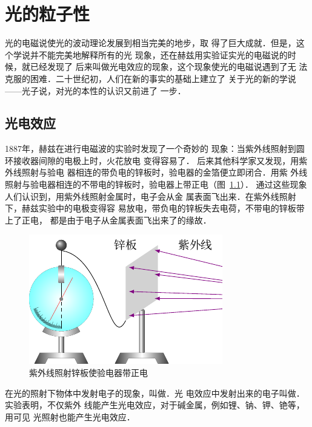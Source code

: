 \chapter{光的粒子性}\label{chapter-particle-nature-of-light}

光的电磁说使光的波动理论发展到相当完美的地步，取
得了巨大成就．但是，这个学说并不能完美地解释所有的光
现象，还在赫兹用实验证实光的电磁说的时候，就已经发现了
后来叫做光电效应的现象，这个现象使光的电磁说遇到了无
法克服的困难．二十世纪初，人们在新的事实的基础上建立了
关于光的新的学说——光子说，对光的本性的认识又前进了
一步．


\section{光电效应}
1887年，赫兹在进行电磁波的实验时发现了一个奇妙的
现象：当紫外线照射到圆环接收器间隙的电极上时，火花放电
变得容易了．
后来其他科学家又发现，用紫外线照射与验电
器相连的带负电的锌板时，验电器的金箔便立即闭合．用紫
外线照射与验电器相连的不带电的锌板时，验电器上带正电（图~\ref{fig_C_7-1}）．
通过这些现象人们认识到，用紫外线照射金属时，电子会从金
属表面飞出来．在紫外线照射下，赫兹实验中的电极变得容
易放电，带负电的锌板失去电荷，不带电的锌板带上了正电，
都是由于电子从金属表面飞出来了的缘故．
\begin{figure}[htbp]
    \centering
    \includegraphics{fig/C/7-1.pdf}
    \caption{紫外线照射锌板使验电器带正电}\label{fig_C_7-1}
\end{figure}

在光的照射下物体中发射电子的现象，叫做．光
电效应中发射出来的电子叫做．实验表明，不仅紫外
线能产生光电效应，对于碱金属，例如锂、钠、钾、铯等，用可见
光照射也能产生光电效应．


